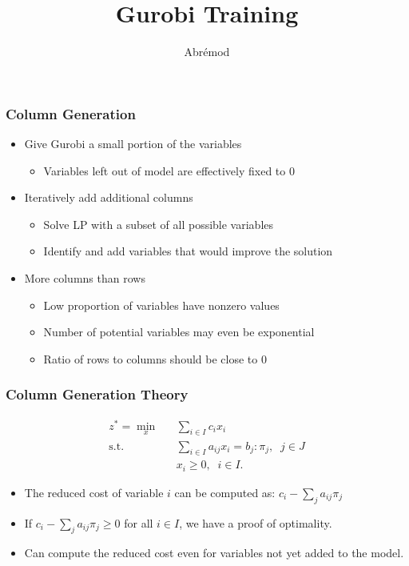 \documentclass[12pt,handout]{beamer}
\title{Gurobi Training}
\author{Abr\'emod}
\begin{document}
\begin{frame}
\frametitle{Column Generation}
\begin{itemize}
  \item Give Gurobi a small portion of the variables
    \begin{itemize}
      \item Variables left out of model are effectively fixed to 0
    \end{itemize}
  \item Iteratively add additional columns
    \begin{itemize}
    \item Solve LP with a subset of all possible variables
    \item Identify and add variables that would improve the solution
    \end{itemize}      
    \item More columns than rows
    \begin{itemize}
      \item Low proportion of variables have nonzero values
      \item Number of potential variables may even be exponential
      \item Ratio of rows to columns should be close to 0
    \end{itemize}
\end{itemize}
\end{frame}

\begin{frame}
\frametitle{Column Generation Theory}
\begin{eqnarray}
z^* = \min_x && \sum_{i \in I} c_i x_i  \nonumber \\
\mbox{s.t.} && \sum_{i \in I} a_{ij} x_i  = b_j : \pi_j,\;\;j \in J \nonumber \\
&& x_i \ge 0,\;\;i \in I. \nonumber
\end{eqnarray}

\begin{itemize}
\item The reduced cost of variable $i$ can be computed as: $c_i - \sum_{j} a_{ij} \pi_j$
\item If $c_i - \sum_{j} a_{ij} \pi_j \ge 0$ for all $i \in I$, we have a proof of optimality.
\item Can compute the reduced cost even for variables not yet added to the model.
\end{itemize}
\end{frame}
\end{document}
